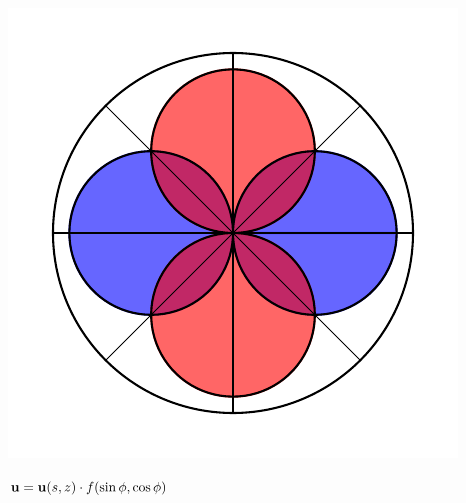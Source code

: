 \documentclass{article}
\renewcommand{\vec}[1]{\ensuremath{\mathbf{#1}}}
\begin{document}
\begin{center}
\begin{minipage}[t]{0.4\paperwidth}
        \begin{minipage}[c]{0.1\paperwidth}
            \includegraphics[width=\textwidth]{radpat_di.pdf}
        \end{minipage}%
        \begin{minipage}[c]{0.4\paperwidth}
            $\scriptsize{\vec u = \vec u (s,z)} \cdot f(\sin\phi, \cos\phi)$ \\
        \end{minipage}
    

\end{minipage}
\end{center}
\end{document}
